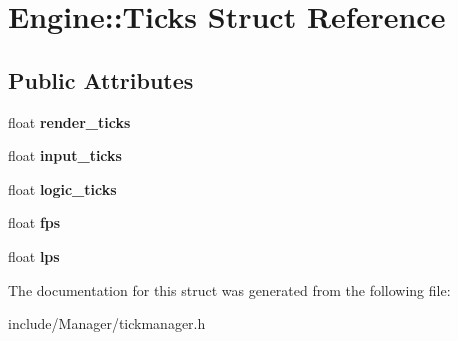 \hypertarget{structEngine_1_1Ticks}{}\section{Engine\+:\+:Ticks Struct Reference}
\label{structEngine_1_1Ticks}
\subsection*{Public Attributes}
\begin{DoxyCompactItemize}
\item 
\hypertarget{structEngine_1_1Ticks_aa8ce4bfa366567892fc6926f3b383c36}{}float {\bfseries render\+\_\+ticks}\label{structEngine_1_1Ticks_aa8ce4bfa366567892fc6926f3b383c36}

\item 
\hypertarget{structEngine_1_1Ticks_a9291119e0ea5021cb5c07b8d3836a80d}{}float {\bfseries input\+\_\+ticks}\label{structEngine_1_1Ticks_a9291119e0ea5021cb5c07b8d3836a80d}

\item 
\hypertarget{structEngine_1_1Ticks_ad0559635ef40049935f6bc87811c632b}{}float {\bfseries logic\+\_\+ticks}\label{structEngine_1_1Ticks_ad0559635ef40049935f6bc87811c632b}

\item 
\hypertarget{structEngine_1_1Ticks_a0c771818ca6fe2c43e24e260592a2ed3}{}float {\bfseries fps}\label{structEngine_1_1Ticks_a0c771818ca6fe2c43e24e260592a2ed3}

\item 
\hypertarget{structEngine_1_1Ticks_ad9467856f3bdfc53727973252d1e70b4}{}float {\bfseries lps}\label{structEngine_1_1Ticks_ad9467856f3bdfc53727973252d1e70b4}

\end{DoxyCompactItemize}


The documentation for this struct was generated from the following file\+:\begin{DoxyCompactItemize}
\item 
include/\+Manager/tickmanager.\+h\end{DoxyCompactItemize}

